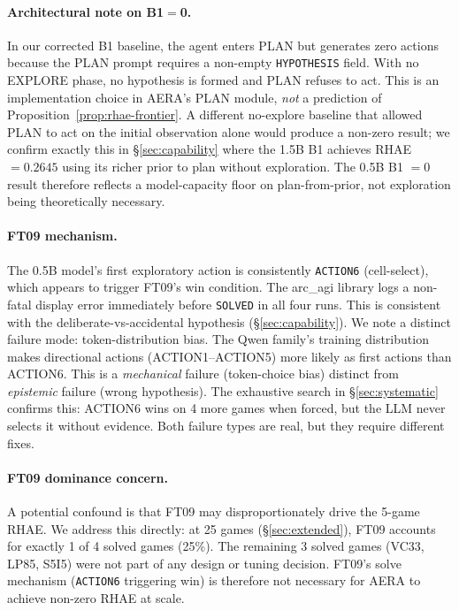 \documentclass[11pt]{article}
\begin{document}
\paragraph{Architectural note on B1$=$0.} In our corrected B1 baseline, the agent enters PLAN but generates zero actions because the PLAN prompt requires a non-empty \texttt{HYPOTHESIS} field. With no EXPLORE phase, no hypothesis is formed and PLAN refuses to act. This is an implementation choice in AERA's PLAN module, \emph{not} a prediction of Proposition~\ref{prop:rhae-frontier}. A different no-explore baseline that allowed PLAN to act on the initial observation alone would produce a non-zero result; we confirm exactly this in \S\ref{sec:capability} where the 1.5B B1 achieves RHAE $=0.2645$ using its richer prior to plan without exploration. The 0.5B B1 $=0$ result therefore reflects a model-capacity floor on plan-from-prior, not exploration being theoretically necessary.

\paragraph{FT09 mechanism.} The 0.5B model's first exploratory action is consistently \texttt{ACTION6} (cell-select), which appears to trigger FT09's win condition. The arc\_agi library logs a non-fatal display error immediately before \texttt{SOLVED} in all four runs. This is consistent with the deliberate-vs-accidental hypothesis (\S\ref{sec:capability}). We note a distinct failure mode: token-distribution bias. The Qwen family's training distribution makes directional actions (ACTION1--ACTION5) more likely as first actions than ACTION6. This is a \emph{mechanical} failure (token-choice bias) distinct from \emph{epistemic} failure (wrong hypothesis). The exhaustive search in \S\ref{sec:systematic} confirms this: ACTION6 wins on 4 more games when forced, but the LLM never selects it without evidence. Both failure types are real, but they require different fixes.

\paragraph{FT09 dominance concern.} A potential confound is that FT09 may disproportionately drive the 5-game RHAE. We address this directly: at 25 games (\S\ref{sec:extended}), FT09 accounts for exactly 1 of 4 solved games (25\%). The remaining 3 solved games (VC33, LP85, S5I5) were not part of any design or tuning decision. FT09's solve mechanism (\texttt{ACTION6} triggering win) is therefore not necessary for AERA to achieve non-zero RHAE at scale.
\end{document}
